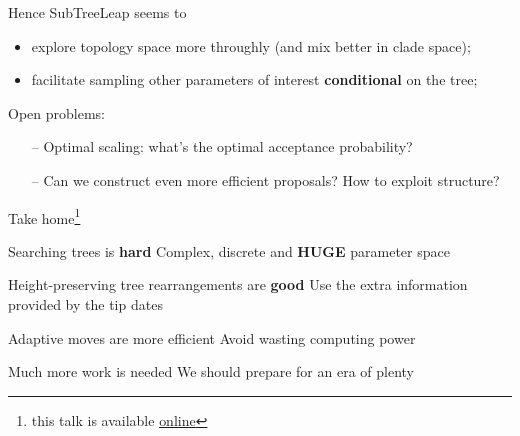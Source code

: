 \documentclass[newPxFont,numfooter,sectionpages]{beamer}
\begin{document}
\begin{frame}{Hence}
SubTreeLeap seems to
\begin{itemize}
 \item explore topology space more throughly (and mix better in clade space);
 \item facilitate sampling other parameters of interest \textbf{conditional} on the tree;
\end{itemize}

Open problems:
\begin{itemize}
 \item[--] Optimal scaling: what's the optimal acceptance probability?
 \item[--] Can we construct even more efficient proposals? How to exploit structure?
\end{itemize}
\end{frame}

\begin{frame}{Take home\footnote{\tiny this talk is available \href{https://github.com/maxbiostat/stats_seminar_2017}{online}}}
\begin{alertblock}{Searching trees is \textbf{hard}}
Complex, discrete and \textbf{HUGE} parameter space
\end{alertblock}\pause
\begin{exampleblock}{Height-preserving tree rearrangements are \textbf{good}}
Use the extra information provided by the tip dates
\end{exampleblock}\pause
\begin{block}{Adaptive moves are more efficient}
 Avoid wasting computing power
\end{block}\pause
\begingroup
{}
\begin{block}{Much more work is needed}
We should prepare for an era of plenty
\end{block}
\endgroup
\end{frame}

\begingroup
{}
\begin{frame}[plain]


\end{frame}
\endgroup
\end{document}
